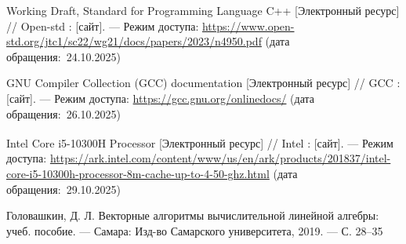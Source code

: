
\begin{thebibliography}{}
	Working Draft, Standard for Programming Language C++ [Электронный ресурс] // Open-std : [сайт]. — Режим доступа: \url{https://www.open-std.org/jtc1/sc22/wg21/docs/papers/2023/n4950.pdf} (дата обращения:~24.10.2025)
	
	GNU Compiler Collection (GCC) documentation [Электронный ресурс] // GCC : [сайт]. — Режим доступа: \url{https://gcc.gnu.org/onlinedocs/} (дата обращения:~26.10.2025)
	
	Intel\textsuperscript{\textregistered} Core\texttrademark{} i5-10300H Processor [Электронный ресурс] // Intel : [сайт]. — Режим доступа: \url{https://ark.intel.com/content/www/us/en/ark/products/201837/intel-core-i5-10300h-processor-8m-cache-up-to-4-50-ghz.html} (дата обращения:~29.10.2025)
	
	\item Головашкин, Д. Л. Векторные алгоритмы вычислительной линейной алгебры: учеб. пособие. --- Самара: Изд-во Самарского университета, 2019. --- С. 28–35

\end{thebibliography}